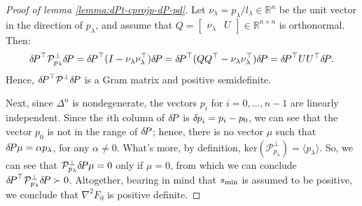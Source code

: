 \documentclass[smallcondensed]{svjour3}
\begin{document}
\begin{proof}[Proof of lemma \ref{lemma:dPt-cprojp-dP-pd}]

  Let $\nu_\lambda = p_\lambda/l_\lambda \in \mathbb{R}^n$ be the unit
  vector in the direction of $p_\lambda$, and assume that
  $Q = \begin{bmatrix} \nu_\lambda & U \end{bmatrix} \in \mathbb{R}^{n
    \times n}$ is orthonormal. Then:
  \begin{equation}
    {\delta \hspace{-0.14em} P}^\top \mathcal{P}^\perp_{p_\lambda} {\delta \hspace{-0.14em} P} = {\delta \hspace{-0.14em} P}^\top {(I - \nu_\lambda \nu_\lambda^\top)} {\delta \hspace{-0.14em} P} = {\delta \hspace{-0.14em} P}^\top {(QQ^\top - \nu_\lambda \nu_\lambda^\top)} {\delta \hspace{-0.14em} P} = {\delta \hspace{-0.14em} P}^\top U U^\top {\delta \hspace{-0.14em} P}.
  \end{equation}
  Hence, ${\delta \hspace{-0.14em} P}^\top \mathcal{P}^\perp {\delta \hspace{-0.14em} P}$ is a Gram matrix
  and positive semidefinite.

  Next, since $\Delta^n$ is nondegenerate, the vectors $p_i$ for
  $i = 0, \hdots, n - 1$ are linearly independent. Since the $i$th
  column of ${\delta \hspace{-0.14em} P}$ is ${\delta \hspace{-0.08em} p}_i = p_i - p_0$, we can see that
  the vector $p_0$ is not in the range of ${\delta \hspace{-0.14em} P}$; hence, there is
  no vector $\mu$ such that ${\delta \hspace{-0.14em} P} \mu = \alpha p_\lambda$, for any
  $\alpha \neq 0$. What's more, by definition,
  $\text{ker}(\mathcal{P}_{p_\lambda}^\perp) = \langle p_\lambda
  \rangle$. So, we can see that
  $\mathcal{P}^\perp_{p_\lambda} {\delta \hspace{-0.14em} P} \mu = 0$ only if $\mu = 0$,
  from which we can conclude
  ${\delta \hspace{-0.14em} P}^\top \mathcal{P}^\perp_{p_\lambda} {\delta \hspace{-0.14em} P} \succ
  0$. Altogether, bearing in mind that $s_{\operatorname{min}}$ is assumed to be
  positive, we conclude that $\nabla^2 F_0$ is positive definite.
\end{proof}
\end{document}
